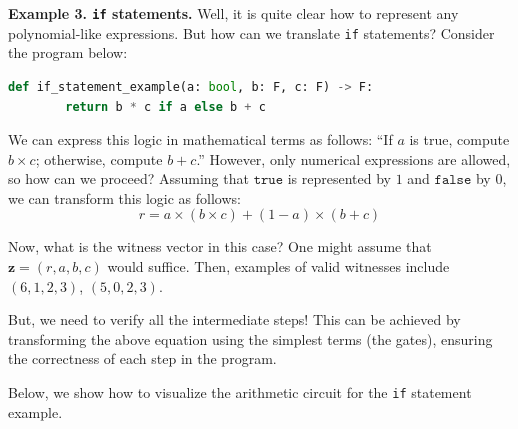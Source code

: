 \documentclass[../../book.tex]{subfiles}
\begin{document}
\textbf{Example 3. \texttt{if} statements.} Well, it is quite clear how to represent any polynomial-like expressions. But how can we translate \texttt{if} statements? Consider the program below:

\begin{lstlisting}[language=Python,numbers=none]
    def if_statement_example(a: bool, b: F, c: F) -> F:
        return b * c if a else b + c
\end{lstlisting}

We can express this logic in mathematical terms as follows: ``If $a$ is true, compute 
$b \times c$; otherwise, compute $b + c$.'' However, only numerical expressions are allowed, so how can we proceed? Assuming that
$\texttt{true}$ is represented by $1$ and $\texttt{false}$ by $0$, we can transform this logic as follows:
\begin{equation*}
    r = a \times (b \times c) + (1 - a) \times (b + c)    
\end{equation*}

Now, what is the witness vector in this case? One might assume that $\mathbf{z} = (r, a, b, c)$ would suffice. Then, examples of valid witnesses include $(6, 1, 2, 3)$, $(5, 0, 2, 3)$.

But, we need to verify all the intermediate steps! This can be achieved by transforming the above
equation using the simplest terms (the gates), ensuring the correctness of each step in the program.

Below, we show how to visualize the arithmetic circuit for the \texttt{if} statement example.
\end{document}
